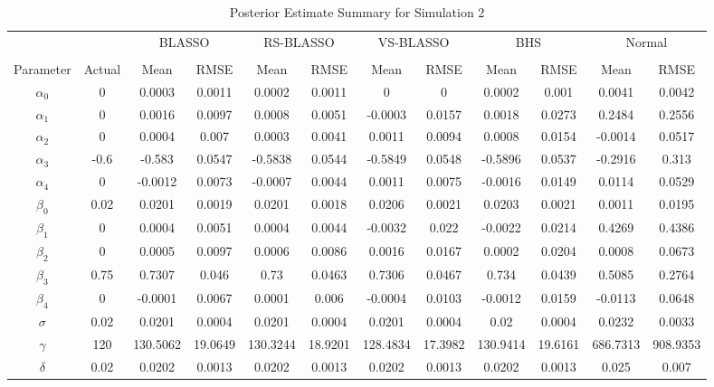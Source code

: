 \begin{table}[h]
	\tiny
  \centering
  \caption{Posterior Estimate Summary for Simulation 2}
  \begin{tabular}{cccccccccccc}
    \toprule
   & & \multicolumn{2}{c}{BLASSO} &\multicolumn{2}{c}{RS-BLASSO} &\multicolumn{2}{c}{VS-BLASSO}  & \multicolumn{2}{c}{BHS} & \multicolumn{2}{c}{Normal} \\
    \cline{3-4} \cline{5-6} \cline{7-8} \cline{9-10} \cline{11-12}\\
    Parameter & Actual & Mean  & RMSE &  Mean & RMSE & Mean & RMSE & Mean & RMSE & Mean & RMSE   \\
    \midrule
    $\alpha_0$ & 0    & 0.0003 & 0.0011 & 0.0002 & 0.0011 & 0    & 0    & 0.0002 & 0.001 & 0.0041 & 0.0042 \\
    $\alpha_1$ & 0    & 0.0016 & 0.0097 & 0.0008 & 0.0051 & -0.0003 & 0.0157 & 0.0018 & 0.0273 & 0.2484 & 0.2556 \\
    $\alpha_2$ & 0    & 0.0004 & 0.007 & 0.0003 & 0.0041 & 0.0011 & 0.0094 & 0.0008 & 0.0154 & -0.0014 & 0.0517 \\
    $\alpha_3$ & -0.6 & -0.583 & 0.0547 & -0.5838 & 0.0544 & -0.5849 & 0.0548 & -0.5896 & 0.0537 & -0.2916 & 0.313 \\
    $\alpha_4$ & 0    & -0.0012 & 0.0073 & -0.0007 & 0.0044 & 0.0011 & 0.0075 & -0.0016 & 0.0149 & 0.0114 & 0.0529 \\
    $\beta_0$ & 0.02 & 0.0201 & 0.0019 & 0.0201 & 0.0018 & 0.0206 & 0.0021 & 0.0203 & 0.0021 & 0.0011 & 0.0195 \\
    $\beta_1$ & 0    & 0.0004 & 0.0051 & 0.0004 & 0.0044 & -0.0032 & 0.022 & -0.0022 & 0.0214 & 0.4269 & 0.4386 \\
    $\beta_2$ & 0    & 0.0005 & 0.0097 & 0.0006 & 0.0086 & 0.0016 & 0.0167 & 0.0002 & 0.0204 & 0.0008 & 0.0673 \\
    $\beta_3$ & 0.75 & 0.7307 & 0.046 & 0.73 & 0.0463 & 0.7306 & 0.0467 & 0.734 & 0.0439 & 0.5085 & 0.2764 \\
    $\beta_4$ & 0    & -0.0001 & 0.0067 & 0.0001 & 0.006 & -0.0004 & 0.0103 & -0.0012 & 0.0159 & -0.0113 & 0.0648 \\
    $\sigma$ & 0.02 & 0.0201 & 0.0004 & 0.0201 & 0.0004 & 0.0201 & 0.0004 & 0.02 & 0.0004 & 0.0232 & 0.0033 \\
    $\gamma$ & 120  & 130.5062 & 19.0649 & 130.3244 & 18.9201 & 128.4834 & 17.3982 & 130.9414 & 19.6161 & 686.7313 & 908.9353 \\
    $\delta$ & 0.02 & 0.0202 & 0.0013 & 0.0202 & 0.0013 & 0.0202 & 0.0013 & 0.0202 & 0.0013 & 0.025 & 0.007 \\

    \bottomrule
    \end{tabular}%
  \label{tab:blassobhssummary3}%
\end{table}%

